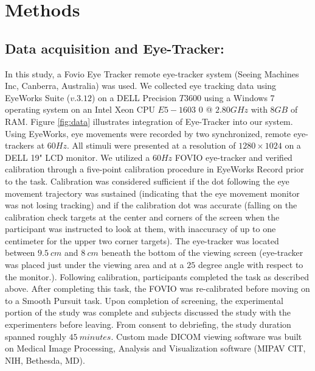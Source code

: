 \documentclass[preprint,12pt]{elsarticle}
\begin{document}
\section{Methods}
\subsection{Data acquisition and Eye-Tracker:}
In this study, a Fovio Eye Tracker  remote eye-tracker system (Seeing Machines Inc, Canberra, Australia) was used. We collected eye tracking data using EyeWorks Suite ($v. 3.12$) on a DELL Precision $T3600$ using a Windows 7 operating system on an Intel Xeon CPU $E5-1603$ 0 @ $2.80 GHz$ with $8 GB$ of RAM. Figure \ref{fig:data} illustrates integration of Eye-Tracker into our system. Using EyeWorks, eye movements were recorded by two synchronized, remote eye-trackers at $60 Hz$. All stimuli were presented at a resolution of $1280\times 1024$ on a DELL 19" LCD monitor. We utilized a $60 Hz$ FOVIO eye-tracker and verified calibration through a five-point calibration procedure in EyeWorks Record prior to the task. Calibration was considered sufficient if the dot following the eye movement trajectory was sustained (indicating that the eye movement monitor was not losing tracking) and if the calibration dot was accurate (falling on the calibration check targets at the center and corners of the screen when the participant was instructed to look at them, with inaccuracy of up to one centimeter for the upper two corner targets). The eye-tracker was located between $9.5\ cm$ and $8\ cm$ beneath the bottom of the viewing screen (eye-tracker was placed just under the viewing area and at a $25$ degree angle with respect to the monitor.). Following calibration, participants completed the task as described above. After completing this task, the FOVIO was re-calibrated before moving on to a Smooth Pursuit task. Upon completion of screening, the experimental portion of the study was complete and subjects discussed the study with the experimenters before leaving. From consent to debriefing, the study duration spanned roughly $45\ minutes$. Custom made DICOM viewing software was built on Medical Image Processing, Analysis and Visualization software (MIPAV CIT, NIH, Bethesda, MD).
\end{document}
